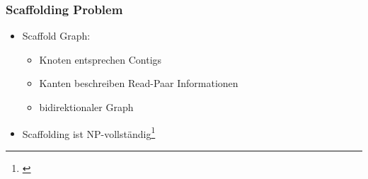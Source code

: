 \documentclass[xcolor=pst]{beamer}
\begin{document}

\begin{frame} %
  \frametitle{Scaffolding Problem}
  \begin{itemize}
  \item Scaffold Graph:
    \begin{itemize}
    \item Knoten entsprechen Contigs
    \item Kanten beschreiben Read-Paar
      Informationen
    \item bidirektionaler Graph
    \end{itemize}
  \item Scaffolding ist NP-vollständig\footnote{\cite{Huson:2002kf}}

  \end{itemize}
\end{frame}
\end{document}
